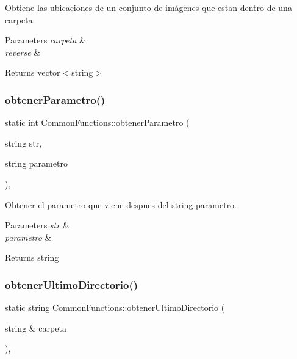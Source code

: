 Obtiene las ubicaciones de un conjunto de imágenes que estan dentro de una carpeta. 


\begin{DoxyParams}{Parameters}
{\em carpeta} & \\
\hline
{\em reverse} & \\
\hline
\end{DoxyParams}
\begin{DoxyReturn}{Returns}
vector$<$string$>$ 
\end{DoxyReturn}
\mbox{\label{classCommonFunctions_adb7c245caab42a6dc8f484527dd2d447}} 
\subsubsection{\texorpdfstring{obtener\+Parametro()}{obtenerParametro()}}
{\footnotesize\ttfamily static int Common\+Functions\+::obtener\+Parametro (\begin{DoxyParamCaption}\item[{string}]{str,  }\item[{string}]{parametro }\end{DoxyParamCaption})\hspace{0.3cm}{\ttfamily [inline]}, {\ttfamily [static]}}



Obtener el parametro que viene despues del string parametro. 


\begin{DoxyParams}{Parameters}
{\em str} & \\
\hline
{\em parametro} & \\
\hline
\end{DoxyParams}
\begin{DoxyReturn}{Returns}
string 
\end{DoxyReturn}
\mbox{\label{classCommonFunctions_a9b3747c4d4a2bc6d897ba1ae2ec59f00}} 
\subsubsection{\texorpdfstring{obtener\+Ultimo\+Directorio()}{obtenerUltimoDirectorio()}}
{\footnotesize\ttfamily static string Common\+Functions\+::obtener\+Ultimo\+Directorio (\begin{DoxyParamCaption}\item[{string \&}]{carpeta }\end{DoxyParamCaption})\hspace{0.3cm}{\ttfamily [inline]}, {\ttfamily [static]}}



